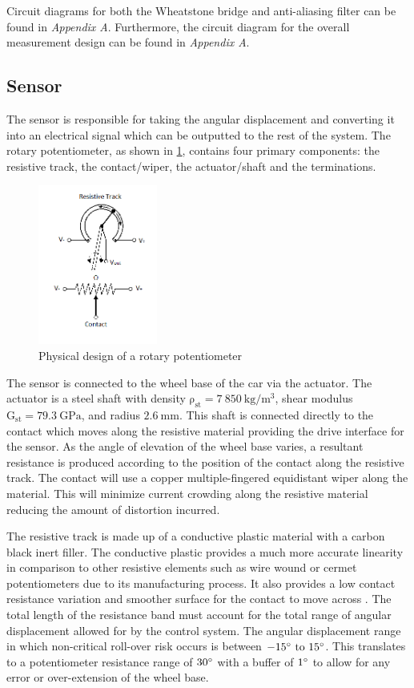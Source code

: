 \documentclass[10pt,twocolumn]{witseiepaper}
\begin{document}
Circuit diagrams for both the Wheatstone bridge and anti-aliasing filter can be found in \textit{Appendix A}. Furthermore, the circuit diagram for the overall measurement design can be found in \textit{Appendix A}.

\subsection{Sensor}

The sensor is responsible for taking the angular displacement and converting it into an electrical signal which can be outputted to the rest of the system. The rotary potentiometer, as shown in \cref{fig:pot}, contains four primary components: the resistive track, the contact/wiper, the actuator/shaft and the terminations.

\begin{figure}[h!]
	\centering
	\includegraphics[width=0.35\textwidth]{Pot2.png}
	\caption{Physical design of a rotary potentiometer}
	\label{fig:pot}
\end{figure}

The sensor is connected to the wheel base of the car via the actuator. The actuator is a steel shaft with density $\mathrm{\rho_{st}} =  7~850~\mathrm{kg/m^3}$, shear modulus $\mathrm{G_{st}} = 79.3~\mathrm{GPa}$, and radius $2.6~\mathrm{mm} $. This shaft is connected directly to the contact which moves along the resistive material providing the drive interface for the sensor. As the angle of elevation of the wheel base varies, a resultant resistance is produced according to the position of the contact along the resistive track. The contact will use a copper multiple-fingered equidistant wiper along the material. This will minimize current crowding along the resistive material reducing the amount of distortion incurred\cite{handbook}.

The resistive track is made up of a conductive plastic material with a carbon black inert filler. The conductive plastic provides a much more accurate linearity in comparison to other resistive elements such as wire wound or cermet potentiometers due to its manufacturing process. It also provides a low contact resistance variation and smoother surface for the contact to move across \cite{handbook}. The total length of the resistance band must account for the total range of angular displacement allowed for by the control system. The angular displacement range in which non-critical roll-over risk occurs is between $-15 ^\circ \mathrm{~to~} 15 ^\circ $. This translates to a potentiometer resistance range of $ 30 ^\circ$ with a buffer of $1 ^\circ $ to allow for any error or over-extension of the wheel base. 
\end{document}

